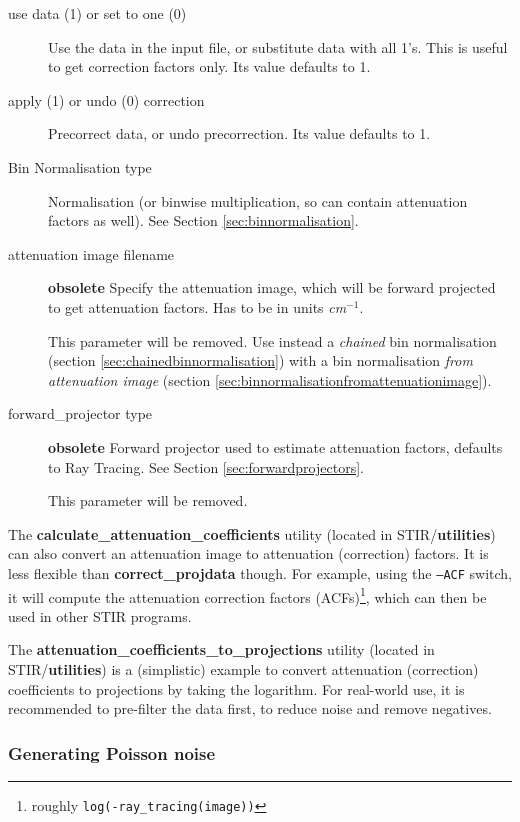 \documentclass{article}
\begin{document}
\begin{description}

\item[use data (1) or set to one (0)]
Use the data in the input file, or substitute data with all 1's. 
This is useful to get correction factors only. Its value defaults 
to 1.

\item[apply (1) or undo (0) correction]
Precorrect data, or undo precorrection. Its value defaults to 
1.

\item[Bin Normalisation type]
Normalisation (or binwise multiplication, so can contain attenuation 
factors as well). See Section \ref{sec:binnormalisation}.


\item[attenuation image filename] \textbf{obsolete}
Specify the attenuation image, which will be forward projected 
to get attenuation factors. Has to be in units \textit{cm}$^{\mathit{-1}}$.


This parameter will be removed. Use instead a \textit{chained} 
bin normalisation (section \ref{sec:chainedbinnormalisation}) 
with a bin normalisation 
\textit{from attenuation image} (section \ref{sec:binnormalisationfromattenuationimage}).


\item[forward\_projector type] \textbf{obsolete}
Forward projector used to estimate attenuation factors, defaults 
to Ray Tracing. See Section \ref{sec:forwardprojectors}.

This parameter will be removed.
\end{description}

The \textbf{calculate\_attenuation\_coefficients} utility (located in STIR/\textbf{utilities})
can also convert an attenuation image to attenuation (correction) factors. It is less
flexible than \textbf{correct\_projdata} though. For example, using the \texttt{--ACF} switch,
it will compute the attenuation correction factors (ACFs)\footnote{roughly
\texttt{log(-ray\_tracing(image))}}, which can then be used in other STIR programs.


The \textbf{attenuation\_coefficients\_to\_projections} utility 
(located in STIR/\textbf{utilities}) is a (simplistic) example to convert
attenuation (correction) coefficients to projections by taking the logarithm.
For real-world use, it is recommended to pre-filter the data first, to reduce noise
and remove negatives.


\subsubsection{
Generating Poisson noise}
\end{document}
